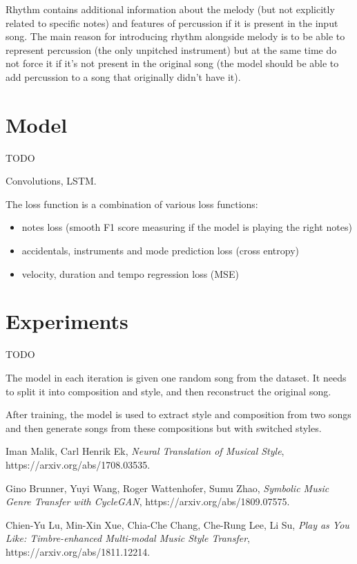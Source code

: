 \documentclass[en]{pracamgr}
\begin{document}
Rhythm contains additional information about the melody (but not explicitly related to specific notes) and features of percussion if it is present in the input song. The main reason for introducing rhythm alongside melody is to be able to represent percussion (the only unpitched instrument) but at the same time do not force it if it's not present in the original song (the model should be able to add percussion to a song that originally didn't have it).

\chapter{Model}

TODO

Convolutions, LSTM.

The loss function is a combination of various loss functions:
\begin{itemize}
\item notes loss (smooth F1 score measuring if the model is playing the right notes)
\item accidentals, instruments and mode prediction loss (cross entropy)
\item velocity, duration and tempo regression loss (MSE)
\end{itemize}

\chapter{Experiments}

TODO

The model in each iteration is given one random song from the dataset. It needs to split it into composition and style, and then reconstruct the original song.

After training, the model is used to extract style and composition from two songs and then generate songs from these compositions but with switched styles.

\begin{thebibliography}{99}

 Iman Malik, Carl Henrik Ek, \textit{Neural Translation of Musical Style}, https://arxiv.org/abs/1708.03535.

 Gino Brunner, Yuyi Wang, Roger Wattenhofer, Sumu Zhao, \textit{Symbolic Music Genre Transfer with CycleGAN}, https://arxiv.org/abs/1809.07575.

 Chien-Yu Lu, Min-Xin Xue, Chia-Che Chang, Che-Rung Lee, Li Su, \textit{Play as You Like: Timbre-enhanced Multi-modal Music Style Transfer}, https://arxiv.org/abs/1811.12214.

\end{thebibliography}
\end{document}
